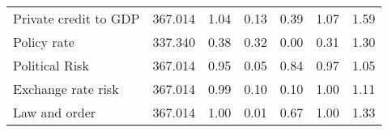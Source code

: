 \begin{longtable}{lcccccc}
\quad Private credit to GDP&      367.014&        1.04&        0.13&        0.39&        1.07&        1.59\\
\quad Policy rate         &      337.340&        0.38&        0.32&        0.00&        0.31&        1.30\\
\quad Political Risk      &      367.014&        0.95&        0.05&        0.84&        0.97&        1.05\\
\quad Exchange rate risk  &      367.014&        0.99&        0.10&        0.10&        1.00&        1.11\\
\quad Law and order       &      367.014&        1.00&        0.01&        0.67&        1.00&        1.33\\
\hline
\end{longtable}
